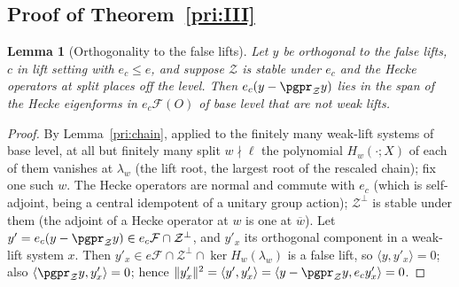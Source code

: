 \documentclass[10pt]{amsart}
\newtheorem{lemma}[theorem]{Lemma}
\theoremstyle{definition}
\theoremstyle{remark}
\begin{document}
\subsection{Proof of Theorem~\ref{pri:III}}\label{pri:ss-proof}

\begin{lemma}[Orthogonality to the false lifts]\label{pri:weak}
Let $y$ be orthogonal to the false lifts, $c$ in lift setting with $e_c\le e$, and suppose
$\mathcal Z$ is stable under $e_c$ and the Hecke operators at split places off the level. Then
$e_c(y-\pgpr_{\mathcal Z}y)$ lies in the span of the Hecke eigenforms in $e_c\mathcal F(O)$ of base
level that are not weak lifts.
\end{lemma}
\begin{proof}
By Lemma~\ref{pri:chain}, applied to the finitely many weak-lift systems of base level, at all but
finitely many split $w\nmid\ell$ the polynomial $H_w(\cdot;X)$ of each of them vanishes at $\lambda_w$
(the lift root, the largest root of the rescaled chain); fix one such $w$. The Hecke operators are
normal and commute with $e_c$ (which is self-adjoint, being a central idempotent of a unitary group
action); $\mathcal Z^\perp$ is stable under them (the adjoint of a Hecke operator at $w$ is one at
$\overline w$). Let $y'=e_c(y-
\pgpr_{\mathcal Z}y)\in e_c\mathcal F\cap\mathcal Z^\perp$, and $y'_x$ its orthogonal component in a
weak-lift system $x$. Then $y'_x\in e\mathcal F\cap\mathcal Z^\perp\cap\ker H_w(\lambda_w)$ is a false
lift, so $\langle y,y'_x\rangle=0$; also $\langle\pgpr_{\mathcal Z}y,y'_x\rangle=0$; hence
$\|y'_x\|^2=\langle y',y'_x\rangle=\langle y-\pgpr_{\mathcal Z}y,e_cy'_x\rangle=0$.
\end{proof}
\end{document}
